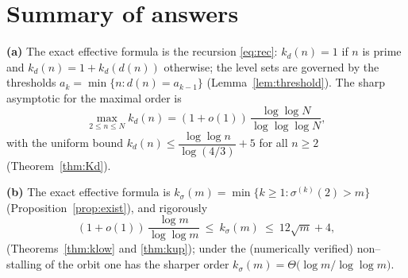 \documentclass{amsart}
\theoremstyle{definition}
\begin{document}
\section*{Summary of answers}

\noindent\textbf{(a)} The exact effective formula is the recursion
\eqref{eq:rec}: $k_d(n)=1$ if $n$ is prime and $k_d(n)=1+k_d(d(n))$ otherwise;
the level sets are governed by the thresholds $a_k=\min\{n:d(n)=a_{k-1}\}$
(Lemma~\ref{lem:threshold}). The sharp asymptotic for the maximal order is
\[
\max_{2\le n\le N}k_d(n)=(1+o(1))\,\frac{\log\log N}{\log\log\log N},
\]
with the uniform bound $k_d(n)\le \dfrac{\log\log n}{\log(4/3)}+5$ for all
$n\ge2$ (Theorem~\ref{thm:Kd}).

\medskip\noindent\textbf{(b)} The exact effective formula is
$k_\sigma(m)=\min\{k\ge1:\sigma^{(k)}(2)>m\}$ (Proposition~\ref{prop:exist}),
and rigorously
\[
(1+o(1))\,\frac{\log m}{\log\log m}\ \le\ k_\sigma(m)\ \le\ 12\sqrt m+4,
\]
(Theorems~\ref{thm:klow} and \ref{thm:kup}); under the (numerically verified)
non--stalling of the orbit one has the sharper order
$k_\sigma(m)=\Theta\!\bigl(\log m/\log\log m\bigr)$.
\end{document}
